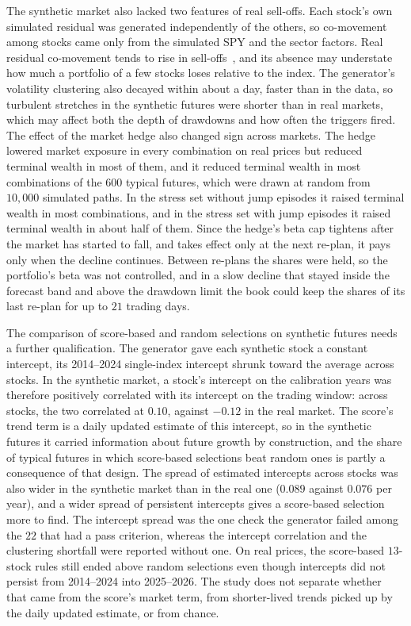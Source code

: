 The synthetic market also lacked two features of real sell-offs. Each stock's own simulated residual was generated
independently of the others, so co-movement among stocks came only from the simulated SPY and the sector factors.
Real residual co-movement tends to rise in sell-offs~\cite{longinSolnik2001, angChen2002}, and its absence may
understate how much a portfolio of a few stocks loses relative to the index. The generator's volatility clustering
also decayed within about a day, faster than in the data, so turbulent stretches in the synthetic futures were
shorter than in real markets, which may affect both the depth of drawdowns and how often the triggers fired. The
effect of the market hedge also changed sign across markets. The hedge lowered
market exposure in every combination on real prices but reduced terminal wealth in most of them, and it reduced
terminal wealth in most combinations of the $600$ typical futures, which were drawn at random from $10{,}000$
simulated paths. In the stress set without jump episodes it raised terminal wealth in most combinations, and in the
stress set with jump episodes it raised terminal wealth in about half of them. Since the hedge's beta cap tightens after
the market has started to fall, and takes effect only at the next re-plan, it pays only when the decline continues.
Between re-plans the shares were held, so the portfolio's beta was not controlled, and in a slow decline that stayed
inside the forecast band and above the drawdown limit the book could keep the shares of its last re-plan for up to
$21$ trading days.

The comparison of score-based and random selections on synthetic futures needs a further qualification. The
generator gave each synthetic stock a constant intercept, its 2014--2024 single-index intercept shrunk toward the
average across stocks. In the synthetic market, a stock's intercept on the calibration years was therefore positively
correlated with its intercept on the trading window: across stocks, the two correlated at $0.10$, against $-0.12$ in the real market.
The score's trend term is a daily updated estimate of this intercept, so in the synthetic futures it carried
information about future growth by construction, and the share of typical futures in which score-based selections
beat random ones is partly a consequence of that design. The spread of estimated intercepts across stocks was also
wider in the synthetic market than in the real one ($0.089$ against $0.076$ per year), and a wider spread of
persistent intercepts gives a score-based selection more to find. The intercept spread was the one check the
generator failed among the $22$ that had a pass criterion, whereas the intercept correlation and the clustering
shortfall were reported without one. On real prices, the score-based $13$-stock rules still ended above random
selections even though intercepts did not persist from 2014--2024 into 2025--2026. The study does not separate
whether that came from the score's market term, from shorter-lived trends picked up by the daily updated estimate,
or from chance.

